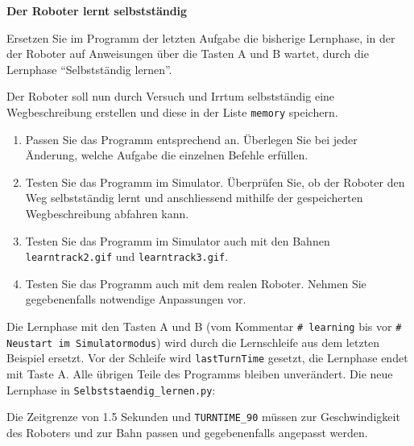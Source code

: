 \begin{myexercise}
    \textbf{Der Roboter lernt selbstständig}

    Ersetzen Sie im Programm der letzten Aufgabe die bisherige
    Lernphase, in der der Roboter auf Anweisungen über die
    Tasten A und B wartet, durch die Lernphase
    \enquote{Selbstständig lernen}.

    Der Roboter soll nun durch Versuch und Irrtum selbstständig
    eine Wegbeschreibung erstellen und diese in der Liste
    \texttt{memory} speichern.

    \begin{enumerate}
        \item Passen Sie das Programm entsprechend an.
              Überlegen Sie bei jeder Änderung, welche
              Aufgabe die einzelnen Befehle erfüllen.

        \item Testen Sie das Programm im Simulator.
              Überprüfen Sie, ob der Roboter den Weg
              selbstständig lernt und anschliessend
              mithilfe der gespeicherten Wegbeschreibung
              abfahren kann.

        \item Testen Sie das Programm im Simulator auch mit den Bahnen \texttt{learntrack2.gif} und \texttt{learntrack3.gif}.

        \item Testen Sie das Programm auch mit dem
              realen Roboter. Nehmen Sie gegebenenfalls
              notwendige Anpassungen vor.
    \end{enumerate}

    \begin{myanswer}
        Die Lernphase mit den Tasten A und B (vom Kommentar \texttt{\# learning} bis vor \texttt{\# Neustart im Simulatormodus}) wird durch die Lernschleife aus dem letzten Beispiel ersetzt. Vor der Schleife wird \texttt{lastTurnTime} gesetzt, die Lernphase endet mit Taste A. Alle übrigen Teile des Programms bleiben unverändert. Die neue Lernphase in \texttt{Selbststaendig\_lernen.py}:
        
        Die Zeitgrenze von 1.5 Sekunden und \texttt{TURNTIME\_90} müssen zur Geschwindigkeit des Roboters und zur Bahn passen und gegebenenfalls angepasst werden.
    \end{myanswer}
\end{myexercise}


